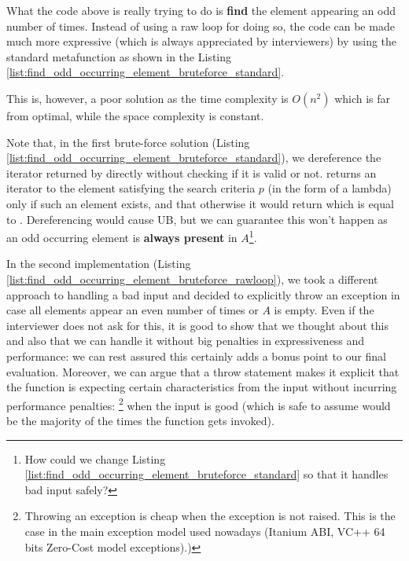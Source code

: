 

What the code above is really trying to do is \textbf{find} the element appearing an odd number of times.
Instead of using a raw loop for doing so, the code can be made much more expressive (which is always appreciated  by interviewers) by using the standard  metafunction  as shown in the Listing \ref{list:find_odd_occurring_element_bruteforce_standard}.




This is, however, a poor solution as the time complexity is $O(n^2)$ which is far from optimal, while the space complexity is constant. 


Note that, in the first brute-force solution (Listing \ref{list:find_odd_occurring_element_bruteforce_standard}), we dereference the iterator returned by  directly without checking if it is valid or not. 
 returns an iterator to the element satisfying the search criteria $p$ (in the form of a lambda)  only if such an element exists, and that otherwise it would return  which is  equal to .
Dereferencing  would cause UB, but we can guarantee this won't happen as an odd occurring element is \textbf{always present} in $A$\footnote{How could we change Listing \ref{list:find_odd_occurring_element_bruteforce_standard} so that it handles bad input safely?}.


In the second implementation (Listing \ref{list:find_odd_occurring_element_bruteforce_rawloop}), we took a different approach to handling a bad input and decided to explicitly throw an exception in case all elements appear an even number of times or $A$ is empty. 
Even if the interviewer does not ask for this, it is good to show that we thought about this and also that we can handle it without big penalties in expressiveness and performance: we can rest assured this certainly adds a bonus point to our final evaluation. 
Moreover, we can argue that a throw statement makes it explicit that the function is expecting certain characteristics from the input without incurring performance penalties: \footnote{Throwing an exception is cheap when the exception is not raised. This is the case in the main exception model used nowadays (Itanium ABI, VC++ 64 bits Zero-Cost model exceptions)\cite{cit:web:openstd_exception}.)} when the input is  good
(which is safe to assume would be the majority of the times the function gets invoked).

